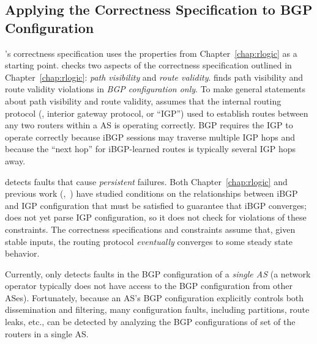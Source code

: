 \subsection{Applying the Correctness Specification to BGP Configuration} 
\label{sec:correct}

\rccns's correctness specification uses the properties from
Chapter~\ref{chap:rlogic} as a starting point. \rcc checks two aspects
of the correctness specification outlined in Chapter~\ref{chap:rlogic}:
{\em path visibility} and \emph{route validity}.  \rcc finds path
visibility and route validity violations in {\em BGP configuration
only}. To make general statements about path visibility and route
validity, \rcc assumes that the internal routing protocol (\ie, interior
gateway protocol, or ``IGP'') used to establish routes between any two
routers within a AS is operating correctly.  BGP requires the IGP to
operate correctly because iBGP sessions may traverse multiple IGP hops
and because the ``next hop'' for iBGP-learned routes is typically
several IGP hops away.

\rcc detects faults that cause {\em persistent} failures.  Both
Chapter~\ref{chap:rlogic} and previous work (\eg,~\cite{Griffin2002})
have studied conditions on the relationships between iBGP and
IGP configuration that must be satisfied to guarantee that iBGP
converges; \rcc does not yet parse IGP configuration, so it does not
check for violations of these constraints.
%
The correctness specifications and constraints assume that,
given stable inputs, the routing protocol {\em eventually} converges to
some steady state behavior.

Currently, \rcc only detects faults in the BGP configuration of a {\em
single AS} (a network operator typically does not have access to the BGP
configuration from other ASes).  Fortunately, because an AS's BGP configuration
explicitly controls both dissemination and filtering, many configuration
faults, including partitions, route leaks, etc., can be detected by
analyzing the BGP configurations of set of the routers in a single AS.





